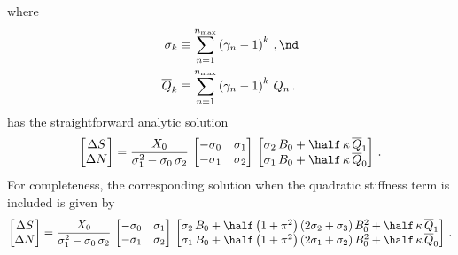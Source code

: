 where
 \begin{align}
\sigma_k &\equiv \sum_{n = 1}^{n_\text{max}} \left(\gamma_n - 1\right)^k\, , \nd \\
\overline{Q}_k &\equiv \sum_{n = 1}^{n_\text{max}} \left(\gamma_n - 1\right)^k\, Q_n\, .
 \end{align}
 has the straightforward analytic solution
 \begin{equation}\label{eqn:rms_sol}
\begin{bmatrix}
  \Delta S \\
  \Delta N
\end{bmatrix} = \frac{X_0}{\sigma_1^2 - \sigma_0\, \sigma_2}\,
\begin{bmatrix}
  -\sigma_0 & \sigma_1 \\
  -\sigma_1 & \sigma_2
\end{bmatrix}\,
\begin{bmatrix}
  \sigma_2\, B_0 + \half\, \kappa\, \overline{Q}_1 \\
  \sigma_1\, B_0 + \half\, \kappa\, \overline{Q}_0
\end{bmatrix}\, .
 \end{equation}
For completeness, the corresponding solution when the quadratic stiffness term is included is given by
 \begin{equation}\label{eqn:rms_sol_quad}
\begin{bmatrix}
  \Delta S \\
  \Delta N
\end{bmatrix} = \frac{X_0}{\sigma_1^2 - \sigma_0\, \sigma_2}\,
\begin{bmatrix}
  -\sigma_0 & \sigma_1 \\
  -\sigma_1 & \sigma_2
\end{bmatrix}\,
\begin{bmatrix}
  \sigma_2\, B_0 + \half \left(1 + \pi^2\right) \left(2 \sigma_2 + \sigma_3\right) B_0^2 + \half\, \kappa\, \overline{Q}_1 \\
  \sigma_1\, B_0 + \half \left(1 + \pi^2\right) \left(2 \sigma_1 + \sigma_2\right) B_0^2 + \half\, \kappa\, \overline{Q}_0
\end{bmatrix}\, .
 \end{equation}


